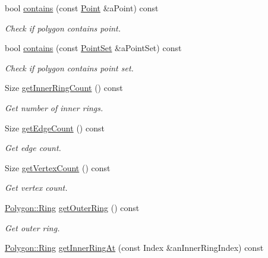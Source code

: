 \begin{DoxyCompactItemize}
bool \hyperlink{classostk_1_1math_1_1geom_1_1d2_1_1objects_1_1_polygon_aa9f49a046d832821a8b26064b3cf2158}{contains} (const \hyperlink{classostk_1_1math_1_1geom_1_1d2_1_1objects_1_1_point}{Point} \&a\+Point) const
\begin{DoxyCompactList}\small\item\em Check if polygon contains point. \end{DoxyCompactList}\item 
bool \hyperlink{classostk_1_1math_1_1geom_1_1d2_1_1objects_1_1_polygon_a6a95f14d1bcbc3d0231ed09f31d17045}{contains} (const \hyperlink{classostk_1_1math_1_1geom_1_1d2_1_1objects_1_1_point_set}{Point\+Set} \&a\+Point\+Set) const
\begin{DoxyCompactList}\small\item\em Check if polygon contains point set. \end{DoxyCompactList}\item 
Size \hyperlink{classostk_1_1math_1_1geom_1_1d2_1_1objects_1_1_polygon_a47930b6706bc8b54754e064f0d0ec29b}{get\+Inner\+Ring\+Count} () const
\begin{DoxyCompactList}\small\item\em Get number of inner rings. \end{DoxyCompactList}\item 
Size \hyperlink{classostk_1_1math_1_1geom_1_1d2_1_1objects_1_1_polygon_a585310d630d1e80f496a9525a308bb2b}{get\+Edge\+Count} () const
\begin{DoxyCompactList}\small\item\em Get edge count. \end{DoxyCompactList}\item 
Size \hyperlink{classostk_1_1math_1_1geom_1_1d2_1_1objects_1_1_polygon_ac53efcb8236507a884323d5db2dd5cdf}{get\+Vertex\+Count} () const
\begin{DoxyCompactList}\small\item\em Get vertex count. \end{DoxyCompactList}\item 
\hyperlink{classostk_1_1math_1_1geom_1_1d2_1_1objects_1_1_polygon_a2cfc117e0bd669946a670640eae4ee4c}{Polygon\+::\+Ring} \hyperlink{classostk_1_1math_1_1geom_1_1d2_1_1objects_1_1_polygon_a051e05d5e1a0e7e1a3e14fd7441ebbf0}{get\+Outer\+Ring} () const
\begin{DoxyCompactList}\small\item\em Get outer ring. \end{DoxyCompactList}\item 
\hyperlink{classostk_1_1math_1_1geom_1_1d2_1_1objects_1_1_polygon_a2cfc117e0bd669946a670640eae4ee4c}{Polygon\+::\+Ring} \hyperlink{classostk_1_1math_1_1geom_1_1d2_1_1objects_1_1_polygon_af1974ca25ea35ce4857dcac525f1180c}{get\+Inner\+Ring\+At} (const Index \&an\+Inner\+Ring\+Index) const

\end{DoxyCompactItemize}
